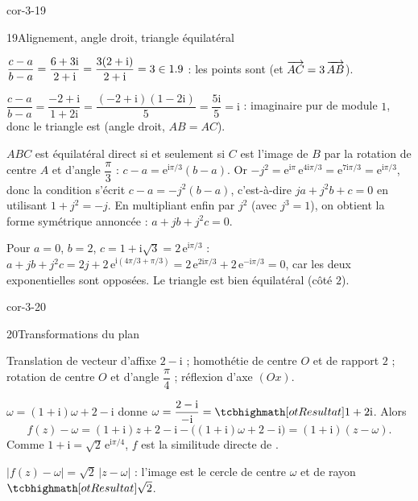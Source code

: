 \begin{blocLivre}{cor-3-19}
\begin{corrige}{19}{Alignement, angle droit, triangle équilatéral}
\begin{questions}
  \item $\dfrac{c-a}{b-a}=\dfrac{6+3\mathrm{i}}{2+\mathrm{i}}=\dfrac{3(2+\mathrm{i})}{2+\mathrm{i}}=3\in1.9$ :
    les points sont  (et $\overrightarrow{AC}=3\,\overrightarrow{AB}$).
  \item $\dfrac{c-a}{b-a}=\dfrac{-2+\mathrm{i}}{1+2\mathrm{i}}
    =\dfrac{(-2+\mathrm{i})(1-2\mathrm{i})}{5}=\dfrac{5\mathrm{i}}{5}=\mathrm{i}$ :
    imaginaire pur de module $1$, donc le triangle est
     (angle droit, $AB=AC$).
  \item $ABC$ est équilatéral direct si et seulement si $C$ est l'image de
    $B$ par la rotation de centre $A$ et d'angle $\dfrac{\pi}{3}$ :
    $c-a=\mathrm{e}^{\mathrm{i}\pi/3}(b-a)$. Or
    $-j^{2}=\mathrm{e}^{\mathrm{i}\pi}\,\mathrm{e}^{4\mathrm{i}\pi/3}=\mathrm{e}^{7\mathrm{i}\pi/3}
    =\mathrm{e}^{\mathrm{i}\pi/3}$, donc la condition s'écrit
    $c-a=-j^{2}(b-a)$, c'est-à-dire $ja+j^{2}b+c=0$ en utilisant
    $1+j^{2}=-j$. En multipliant enfin par $j^{2}$ (avec $j^{3}=1$), on
    obtient la forme symétrique annoncée : $a+jb+j^{2}c=0$.
  \item Pour $a=0$, $b=2$, $c=1+\mathrm{i}\sqrt3=2\,\mathrm{e}^{\mathrm{i}\pi/3}$ :
    $a+jb+j^{2}c=2j+2\,\mathrm{e}^{\mathrm{i}(4\pi/3+\pi/3)}
    =2\,\mathrm{e}^{2\mathrm{i}\pi/3}+2\,\mathrm{e}^{-\mathrm{i}\pi/3}=0$,
    car les deux exponentielles sont opposées. Le triangle est bien
    équilatéral (côté $2$).
\end{questions}
\end{corrige}
\end{blocLivre}

\begin{blocLivre}{cor-3-20}
\begin{corrige}{20}{Transformations du plan}
\begin{questions}
  \item Translation de vecteur d'affixe $2-\mathrm{i}$ ; homothétie de centre
    $O$ et de rapport $2$ ; rotation de centre $O$ et d'angle
    $\dfrac{\pi}{4}$ ; réflexion d'axe $(Ox)$.
  \item $\omega=(1+\mathrm{i})\omega+2-\mathrm{i}$ donne
    $\omega=\dfrac{2-\mathrm{i}}{-\mathrm{i}}=\res{1+2\mathrm{i}}$. Alors
    \[
      f(z)-\omega=(1+\mathrm{i})z+2-\mathrm{i}-\bigl((1+\mathrm{i})\omega+2-\mathrm{i}\bigr)
      =(1+\mathrm{i})(z-\omega).
    \]
    Comme $1+\mathrm{i}=\sqrt2\,\mathrm{e}^{\mathrm{i}\pi/4}$, $f$ est la similitude
    directe de .
  \item $|f(z)-\omega|=\sqrt2\,|z-\omega|$ : l'image est le cercle de centre
    $\omega$ et de rayon $\res{\sqrt2}$.
\end{questions}
\end{corrige}
\end{blocLivre}

